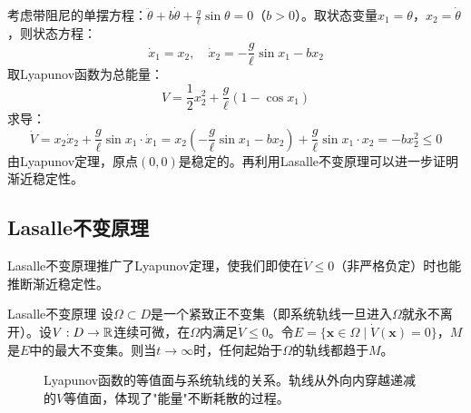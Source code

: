 \begin{example}[单摆的Lyapunov分析]
考虑带阻尼的单摆方程：$\ddot{\theta} + b\dot{\theta} + \frac{g}{\ell}\sin\theta = 0$（$b > 0$）。取状态变量$x_1 = \theta$，$x_2 = \dot{\theta}$，则状态方程：
\[
\dot{x}_1 = x_2,\quad \dot{x}_2 = -\frac{g}{\ell}\sin x_1 - b x_2
\]
取Lyapunov函数为总能量：
\[
V = \frac{1}{2}x_2^2 + \frac{g}{\ell}(1 - \cos x_1)
\]
求导：
\[
\dot{V} = x_2\dot{x}_2 + \frac{g}{\ell}\sin x_1 \cdot \dot{x}_1
= x_2\left(-\frac{g}{\ell}\sin x_1 - b x_2\right) + \frac{g}{\ell}\sin x_1 \cdot x_2 = -b x_2^2 \le 0
\]
由Lyapunov定理，原点$(0, 0)$是稳定的。再利用Lasalle不变原理可以进一步证明渐近稳定性。
\end{example}

\subsection{Lasalle不变原理}

Lasalle不变原理推广了Lyapunov定理，使我们即使在$\dot{V} \le 0$（非严格负定）时也能推断渐近稳定性。

\begin{myTheorem}{Lasalle不变原理}
设$\Omega \subset D$是一个紧致正不变集（即系统轨线一旦进入$\Omega$就永不离开）。设$V: D \to \mathbb{R}$连续可微，在$\Omega$内满足$\dot{V} \le 0$。令$E = \{\mathbf{x} \in \Omega \mid \dot{V}(\mathbf{x}) = 0\}$，$M$是$E$中的最大不变集。则当$t \to \infty$时，任何起始于$\Omega$的轨线都趋于$M$。
\end{myTheorem}

\begin{figure}[H]
\centering
{}
\caption{Lyapunov函数的等值面与系统轨线的关系。轨线从外向内穿越递减的$V$等值面，体现了"能量"不断耗散的过程。}
\label{fig:ch11_lyapunov_levelsets}
\end{figure}

